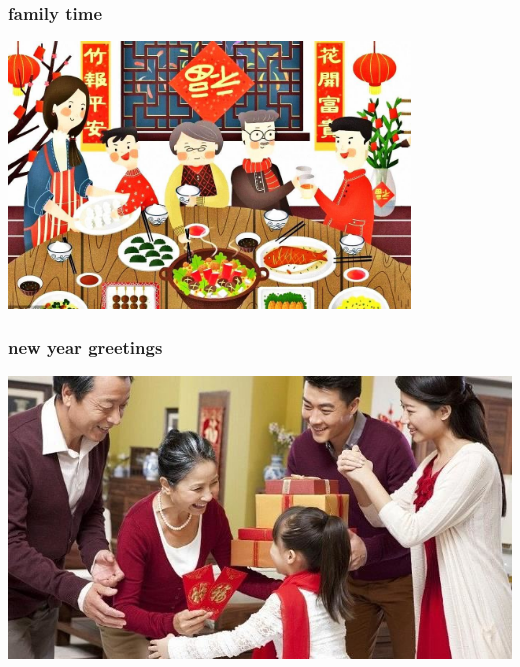 \documentclass[17pt]{beamer}
\begin{document}
\begin{frame}
  \frametitle{family time}

  \begin{center}
    \includegraphics[width=0.8\textwidth]{./images/tuanju}
  \end{center}
\end{frame}

\begin{frame}
  \frametitle{new year greetings}
  \begin{center}
    \includegraphics[width=.9\textwidth]{./images/bainian}
  \end{center}
\end{frame}
\end{document}
